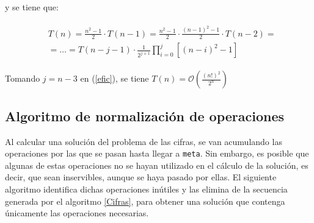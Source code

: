 \documentclass[a4paper,10pt]{scrartcl}
\def\C++#1{\texttt{#1}}
\begin{document}
\begin{itemize}
    y se tiene que:
    
    \begin{gather}
    \begin{split}
     \label{efic}
    &T(n)=\frac{n^2-1}{2}\cdot T(n-1)= \frac{n^2-1}{2}\cdot\frac{(n-1)^2-1}{2}
    \cdot T(n-2)=\\ \nonumber
    &=\ldots=T(n-j-1)\cdot\frac{1}{2^{j+1}}\prod_{i=0}^j[(n-i)^2-1]
    \end{split}
    \end{gather}
    
    Tomando $j=n-3$ en (\ref{efic}), se tiene $T(n)=
    \mathcal{O}\left(\frac{(n!)^2}{2^n}\right)$
   \end{itemize}

   \newpage
   
\subsection{Algoritmo de normalización de operaciones}
   Al calcular una solución del problema de las cifras, se van acumulando las operaciones
   por las que se pasan hasta llegar a \C++{meta}. Sin embargo, es posible que algunas de
   estas operaciones no se hayan utilizado en el cálculo de la solución, es decir, que sean
   inservibles, aunque se haya pasado por ellas. El siguiente algoritmo identifica dichas
   operaciones inútiles y las elimina de la secuencia generada por el algoritmo \ref{Cifras},
   para obtener una solución que contenga únicamente las operaciones necesarias.


   
\end{document}
